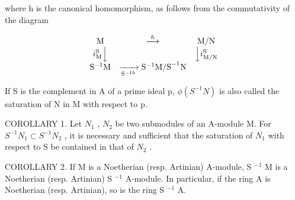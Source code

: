 where h is the canonical homomorphism, as follows from the commutativity of the diagram

\[
\begin{array}{c c c} \mathrm{M} & \stackrel {{h}} {{\longrightarrow}} & \mathrm{M/N} \\ i _ {\mathrm{M}} ^ {\mathrm{S}} \Big \downarrow & & \Big \downarrow i _ {\mathrm{M/N}} ^ {\mathrm{S}} \\ \mathrm{S} ^ {- 1} \mathrm{M} & \xrightarrow [ \mathrm{S} ^ {- 1 h} ]{} \mathrm{S} ^ {- 1} \mathrm{M/S} ^ {- 1} \mathrm{N} \end{array}
\]

If S is the complement in A of a prime ideal p, \(\phi(S^{-1}N)\) is also called the saturation of N in M with respect to p.

COROLLARY 1. Let \(N_{1}\) , \(N_{2}\) be two submodules of an A-module M. For \(S^{-1}N_{1} \subset S^{-1}N_{2}\) , it is necessary and sufficient that the saturation of \(N_{1}\) with respect to S be contained in that of \(N_{2}\) .

COROLLARY 2. If M is a Noetherian (resp. Artinian) A-module, S \(^{-1}\) M is a Noetherian (resp. Artinian) S \(^{-1}\) A-module. In particular, if the ring A is Noetherian (resp. Artinian), so is the ring S \(^{-1}\) A.

